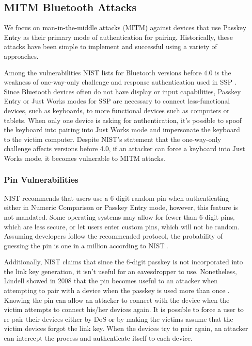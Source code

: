 \documentclass{acm_proc_article-sp}
\begin{document}
\subsection{MITM Bluetooth Attacks}
We focus on man-in-the-middle attacks (MITM) against devices that use Passkey Entry as their primary mode of authentication for pairing. Historically, these attacks have been simple to implement and successful using a variety of approaches.  

Among the vulnerabilities NIST lists for Bluetooth versions before 4.0 is the weakness of one-way-only challenge and response authentication used in SSP \cite{scarfone2008guide}. 
Since Bluetooth devices often do not have display or input capabilities, Passkey Entry or Just Works modes for SSP are necessary to connect less-functional devices, such as keyboards, to more functional devices such as computers or tablets. When only one device is asking for authentication, it's possible to spoof the keyboard into pairing into Just Works mode and impersonate the keyboard to the victim computer. Despite NIST's statement that the one-way-only challenge affects versions before 4.0, if an attacker can force a keyboard into Just Works mode, it becomes vulnerable to MITM attacks.

\subsubsection{Pin Vulnerabilities}
NIST recommends that users use a 6-digit random pin when authenticating either in Numeric Comparison or Passkey Entry mode, however, this feature is not mandated. Some operating systems may allow for fewer than 6-digit pins, which are less secure, or let users enter custom pins, which will not be random. Assuming developers follow the recommended protocol, the probability of guessing the pin is one in a million according to NIST \cite{scarfone2008guide}. 

Additionally, NIST claims that since the 6-digit passkey is not incorporated into the link key generation, it isn't useful for an eavesdropper to use. Nonetheless, Lindell showed in 2008 that the pin becomes useful to an attacker when attempting to pair with a device when the passkey is used more than once \cite{lindell2008attacks}. Knowing the pin can allow an attacker to connect with the device when the victim attempts to connect his/her devices again. It is possible to force a user to re-pair their devices either by DoS \cite{cuthbertbluetooth} or by making the victims assume that the victim devices forgot the link key\cite{shaked2005cracking}. When the devices try to pair again, an attacker can intercept the process and authenticate itself to each device. 
\end{document}
